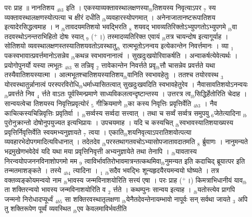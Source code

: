 \documentclass[article,12pt,a4paper]{memoir}%
\newcommand{\add}[1]{($^{+}$#1)}
\begin{document}
	  
	  \pstart \leavevmode%
	\hphantom{.}परः प्राह ॥ {\color{DodgerBlue3}नानतिशय} {\tiny $_{4b3}$} इति । एकस्याव्यक्तावस्थालक्षणस्या{\tiny $_{lb}$}तिशयस्य निवृत्याऽपर {\tiny $_{7}$} स्य व्यक्तावस्थालक्षणस्योत्पत्या च क्षीरं दधीति {\tiny $_{lb}$}व्यवहारस्योपगमात् । अनेनाजातानष्टरूपातिशय इत्यादेरसिद्धत्वमाह । न {\tiny $_{lb}$}तावदयमतिशयो भवद्भिरति {\tiny $_{8}$} शयवद् भावव्यतिरिक्तोऽभ्युपगतोऽभ्युपगमे {\tiny $_{lb}$}वा तदवस्थोऽनन्तराभिहितो दोषः स्यात् {\tiny $_{9}$} \leavevmode{} \add{।} तस्मादव्यतिरिक्त एवायं {\tiny $_{lb}$}तत्र चायन्दोष इत्यागूर्याह । सोतिशयो व्यवस्थालक्षणस्तस्यातिशयवतोऽवस्थातु{\tiny $_{lb}$} \leavevmode{} रात्मभूतोऽनन्वय इत्येकान्तेन निवर्त्तमानः । व्या {\tiny $_{1}$} पकस्वभावात्प्रवर्त्तमानोऽसन्नेव {\tiny $_{lb}$}कथन्न स्वभावनानात्वं । सुखदुःखयोरिवाकर्षति । अन्वाकर्षत्येवेत्यर्थः ।प्रयोगोपुनर्यो यस्या {\color{DodgerBlue3}त्मभूतः} {\tiny $_{4b3}$} स तन्निवृ {\tiny $_{2}$} त्तावेकान्तेन निवर्त्तते प्रवृ{\tiny $_{lb}$}त्तौ चासन्नेव प्रवर्त्तते यथा तस्यैवातिशयस्यात्मा । आत्मभूतश्चातिशयस्यातिशय{\tiny $_{lb}$}वानिति स्वभावहेतुः । ततश्च तयोरवस्थ {\tiny $_{3}$} योरवस्थातुर्न्नानात्वं परस्परविरोधि{\tiny $_{lb}$}धर्माध्यासितत्वात् सुखदुःखवदिति स्वभावहेतुरेव । नैवासावतिशयोऽनन्वयः {\tiny $_{lb}$}प्रवर्त्तते निव {\tiny $_{4}$} र्त्तते वाऽतः पूर्वस्मिन्प्रमाणे साध्यविकलत्वन्दृष्टान्तस्य । उत्तरत्र त्व{\tiny $_{lb}$}सिद्धिर्हेतोरिति चेदाह । {\color{DodgerBlue3}सान्वयत्वेचा} तिशयस्य निवृत्तिप्रवृत्योरं {\tiny $_{5}$} गीक्रियमाणे {\tiny $_{lb}$}का कस्य {\color{DodgerBlue3}निवृत्तिः प्रवृत्तिर्वेति} {\tiny $_{4b3}$} । नैव काचित्कस्यचिन्निवृत्तिः प्रवृतिर्वा । {\tiny $_{lb}$}सर्व्वस्य सर्व्वदा सत्त्वात् । तथा च सर्व्वं सर्व्वत्र समुपयु {\tiny $_{6}$}जेतेत्यादिना {\tiny $_{lb}$}पुरोनुक्रान्तो दोषोनुपयुज्यत इत्यभिप्रायः । उपचयमाह । यदि च कस्यचित् {\tiny $_{lb}$}स्वभावस्यातिशयाख्यस्य प्रवृत्तिर्निवृत्तिर्वेति स्वयमभ्यनुज्ञायते {\tiny $_{7}$} त्वया । एकाति{\tiny $_{lb}$}शयनिवृत्याऽपरातिशयोत्पत्या व्यवहारभेदोपगमादित्यविधानात् । तदेतदेव {\tiny $_{lb}$}परस्तथागतवचोऽभ्यासोपजातावदातमति {\tiny $_{8}$} र्ब्रुवाणः । नानुमन्यते भद्रमुखेणभवेदेवं यदि यथा मया प्रवृत्तिनिवृत्ती अभ्यनुज्ञायेते तथा तेनापि । {\tiny $_{lb}$}यावतास्य निरन्वयोपजननविनाशोपगमो मम {\tiny $_{9}$} \leavevmode{} त्वाविर्भावतिरोभावमात्रन्तत्कथमिवा{\tiny $_{lb}$}नुमन्यत इति कदाचिद् ब्रूयात्पर इति तन्मतमाशङ्कते । {\color{DodgerBlue3}तस्ये} {\tiny $_{4b4}$} त्यादिना । {\tiny $_{1}$} {\tiny $_{lb}$}सदैव भवद्भिः शून्यहृदयैरयमन्वयो घोष्यते । तत्र वक्तव्यङ्कोयमन्वयो नाम {\tiny $_{lb}$}भावस्य जन्मविनाशयोरिति सत्त्यं एषा । परः प्राह \add{।} {\color{DodgerBlue3}किमत्राभिधानीयं} याव{\tiny $_{lb}$}ता शक्तिरन्वयो भावस्य जन्मविनाशयोरिति व {\tiny $_{2}$} र्त्तते । कथम्पुनः सान्वय इत्याह । {\tiny $_{lb}$}यतोस्त्येव {\color{DodgerBlue3}प्रागपि जन्मनो निरोधादप्यूर्ध्वं} {\tiny $_{4b5}$} सा शक्तिरवस्थातृलक्षणा {\tiny $_{lb}$}येनैतदेवन्तेनायम्भावो नापूर्वः सन् सर्वथा जायते {\tiny $_{3}$} अपि तु शक्तिरूपेण पूर्व्वं व्यवस्थित {\tiny $_{lb}$}एव केवलमाविर्भवतीति 
\end{document}
